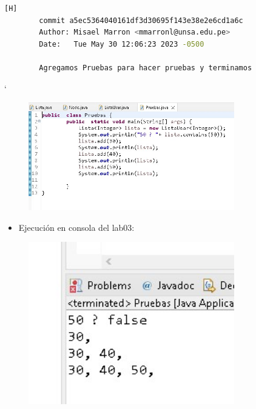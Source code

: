 \documentclass{article}
\begin{document}
	\clearpage
	\begin{lstlisting}[language=bash,caption={Mi cuarto commit es cuando termine todo el lab03 y agregue una ejecucion en una clase llamada Pruebas.}][H]
		commit a5ec5364040161df3d30695f143e38e2e6cd1a6c
		Author: Misael Marron <mmarronl@unsa.edu.pe>
		Date:   Tue May 30 12:06:23 2023 -0500

	    Agregamos Pruebas para hacer pruebas y terminamos
	\end{lstlisting}

`	\begin{figure}[H]
		\centering
		\includegraphics[width=0.8\textwidth,keepaspectratio]{img/codigo4.jpg}	
	\end{figure}
	
	
	\begin{itemize}	
		\item Ejecución en consola del lab03:
	\end{itemize}
	
	\begin{figure}[H]
		\centering
		\includegraphics[width=0.8\textwidth,keepaspectratio]{img/commit01.jpg}	
	\end{figure}
	
\end{document}
